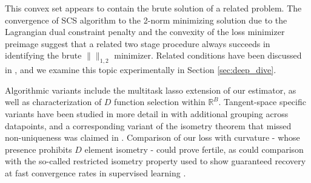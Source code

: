 This convex set appears to contain the brute solution of a related problem.
The convergence of SCS algorithm to the 2-norm minimizing solution due to the Lagrangian dual constraint penalty and the convexity of the loss minimizer preimage suggest that a related two stage procedure always succeeds in identifying the brute $\|\|_{1,2}$ minimizer.
Related conditions have been discussed in \citet{Donoho2006ForML, Mishkin2022TheSP}, and we examine this topic experimentally in Section \ref{sec:deep_dive}.

Algorithmic variants include the multitask lasso \citep{ Hastie2015-qa} extension of our estimator, as well as characterization of $D$ function selection within $\mathbb R^B$.
Tangent-space specific variants have been studied in more detail in \citet{Koelle2022-ju, Koelle2024-no} with additional grouping across datapoints, and a corresponding variant of the isometry theorem that missed non-uniqueness was claimed in \citet{Koelle2022-lp}.
Comparison of our loss with curvature - whose presence prohibits $D$ element isometry - could prove fertile, as could comparison with the so-called restricted isometry property used to show guaranteed recovery at fast convergence rates in supervised learning \citep{Candes2005-dd, Hastie2015-qa}.